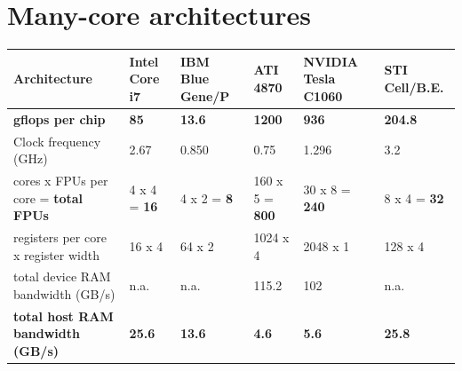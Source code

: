 \documentclass{article}
\begin{document}
\section{Many-core architectures}

\begin{table}[t]
\begin{center}
{\scriptsize %
\begin{tabular}{|l|l|l|l|l|l|}                                                   
\hline
Architecture                                 & Intel Core i7 & IBM Blue Gene/P& ATI 4870 &  NVIDIA Tesla C1060 & STI Cell/B.E. \\
\hline
\textbf{gflops per chip}                     & \textbf{85}   & \textbf{13.6}  & \textbf{1200}  & \textbf{936}  & \textbf{204.8}\\
Clock frequency (GHz)                        & 2.67          & 0.850          & 0.75           & 1.296         & 3.2           \\
cores x FPUs per core = \textbf{total FPUs}  & 4 x 4 = \textbf{16} & 4 x 2 = \textbf{8} & 160 x 5 = \textbf{800} & 30 x 8 = \textbf{240} & 8 x 4 = \textbf{32} \\
registers per core x register width          & 16 x 4        & 64 x 2         & 1024 x 4      & 2048 x 1       & 128 x 4       \\
total device RAM bandwidth (GB/s)            & n.a.          & n.a.           & 115.2         & 102            & n.a.          \\
\textbf{total host RAM bandwidth (GB/s)}     & \textbf{25.6} & \textbf{13.6}  & \textbf{4.6}  & \textbf{5.6}   & \textbf{25.8} \\

\end{tabular}}
\end{center}
\end{table}
\end{document}

